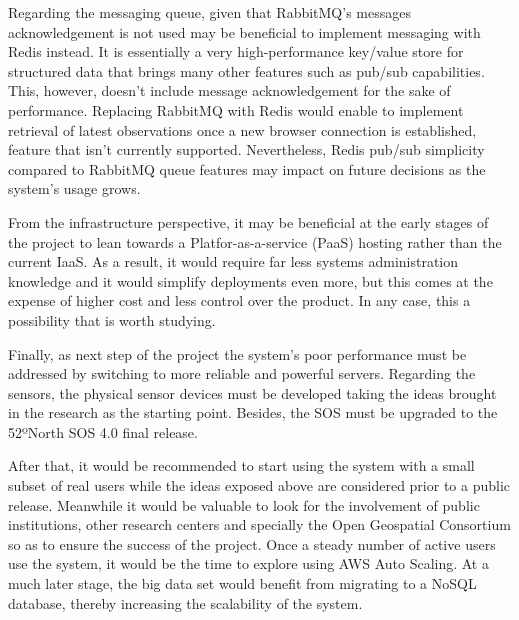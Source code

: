 Regarding the messaging queue, given that RabbitMQ's messages acknowledgement is not used may be beneficial to implement messaging with Redis instead. It is essentially a very high-performance key/value store for structured data that brings many other features such as pub/sub capabilities. This, however, doesn't include message acknowledgement for the sake of performance. Replacing RabbitMQ with Redis would enable to implement retrieval of latest observations once a new browser connection is established, feature that isn't currently supported. Nevertheless, Redis pub/sub simplicity compared to RabbitMQ queue features may impact on future decisions as the system's usage grows.

From the infrastructure perspective, it may be beneficial at the early stages of the project to lean towards a Platfor-as-a-service (PaaS) hosting rather than the current IaaS. As a result, it would require far less systems administration knowledge and it would simplify deployments even more, but this comes at the expense of higher cost and less control over the product. In any case, this a possibility that is worth studying.

Finally, as next step of the project the system's poor performance must be addressed by switching to more reliable and powerful servers. Regarding the sensors, the physical sensor devices must be developed taking the ideas brought in the research as the starting point. Besides, the SOS must be upgraded to the 52ºNorth SOS 4.0 final release.

After that, it would be recommended to start using the system with a small subset of real users while the ideas exposed above are considered prior to a public release. Meanwhile it would be valuable to look for the involvement of public institutions, other research centers and specially the Open Geospatial Consortium so as to ensure the success of the project. Once a steady number of active users use the system, it would be the time to explore using AWS Auto Scaling. At a much later stage, the big data set would benefit from migrating to a NoSQL database, thereby increasing the scalability of the system.
